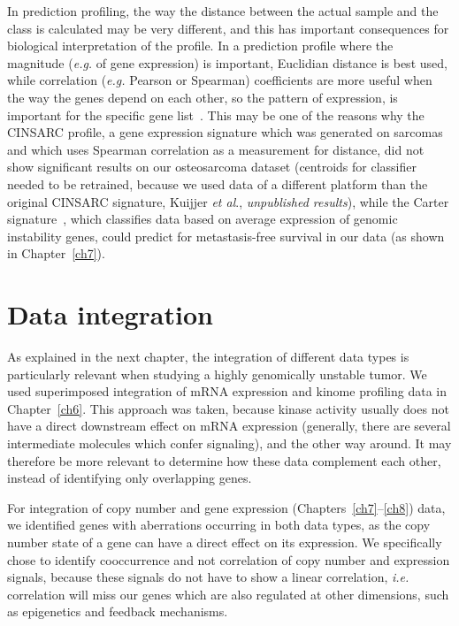 In prediction profiling, the way the distance between the actual sample and the class is calculated may be very different, and this has important consequences for biological interpretation of the profile. In a prediction profile where the magnitude ({\it e.g.} of gene expression) is important, Euclidian distance is best used, while correlation ({\it e.g.} Pearson or Spearman) coefficients are more useful when the way the genes depend on each other, so the pattern of expression, is important for the specific gene list~\cite{quackenbush2006microarray}. This may be one of the reasons why the CINSARC profile, a gene expression signature which was generated on sarcomas~\cite{chibon2010validated} and which uses Spearman correlation as a measurement for distance, did not show significant results on our osteosarcoma dataset (centroids for classifier needed to be retrained, because we used data of a different platform than the original CINSARC signature, Kuijjer {\it et al}., {\it unpublished results}), while the Carter signature~\cite{carter2006signature}, which classifies data based on average expression of genomic instability genes, could predict for metastasis\hyp{}free survival in our data (as shown in Chapter~\ref{ch7}).

%
\section{Data integration}\label{integration1}
As explained in the next chapter, the integration of different data types is particularly relevant when studying a highly genomically unstable tumor. We used superimposed integration of mRNA expression and kinome profiling data in Chapter~\ref{ch6}. This approach was taken, because kinase activity usually does not have a direct downstream effect on mRNA expression (generally, there are several intermediate molecules which confer signaling), and the other way around. It may therefore be more relevant to determine how these data complement each other, instead of identifying only overlapping genes.

For integration of copy number and gene expression (Chapters~\ref{ch7}--\ref{ch8}) data, we identified genes with aberrations occurring in both data types, as the copy number state of a gene can have a direct effect on its expression. We specifically chose to identify cooccurrence and not correlation of copy number and expression signals, because these signals do not have to show a linear correlation, {\it i.e.} correlation will miss our genes which are also regulated at other dimensions, such as epigenetics and feedback mechanisms.

